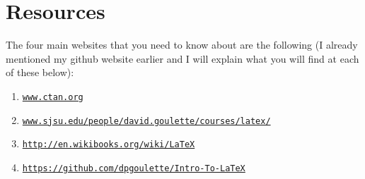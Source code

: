 \documentclass[11pt]{article}
\begin{document}
\section{Resources}
The four main websites that you need to know about are the following (I already mentioned my github website earlier and I will explain what you will find at each of these below):
\begin{enumerate}
\label{important-links}
\item \href{www.ctan.org}{\texttt{www.ctan.org}}
\item \href{https://www.sjsu.edu/people/david.goulette/courses/latex/}{\texttt{www.sjsu.edu/people/david.goulette/courses/latex/}}\label{second-link}
\item \href{http://en.wikibooks.org/wiki/LaTeX}{\texttt{http://en.wikibooks.org/wiki/LaTeX}}
\item \href{https://github.com/dpgoulette/Intro-To-LaTeX}{\texttt{https://github.com/dpgoulette/Intro-To-LaTeX}}
\end{enumerate}
\end{document}
